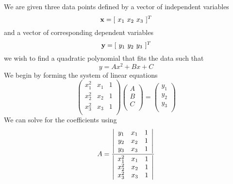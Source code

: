 We are given three data points defined by a vector of independent
variables
%
\begin{equation}
     \mathbf{x} = [\hspace{.05 in} x_1 \hspace{.05 in} x_2 \hspace{.05 in}
     x_3 \hspace{.05
     in}]^T
\end{equation}
%
and a vector of corresponding dependent variables
%
\begin{equation}
     \mathbf{y} = [\hspace{.05 in} y_1 \hspace{.05 in} y_2 \hspace{.05 in}
     y_3  \hspace{.05
     in}]^T
\end{equation}
%
we wish to find a quadratic polynomial that fits the data such that
%
\begin{equation}
   y = Ax^2 + Bx +C
\end{equation}
%
We begin by forming the system of linear equations
%
\begin{equation}
    \left(%
    \begin{array}{ccc}
       x_1^2 & x_1 & 1 \\
       x_2^2 & x_2 & 1 \\
       x_3^2 & x_3 & 1 \\
    \end{array}%
    \right)
     \left(%
    \begin{array}{ccc}
       A \\
       B \\
       C \\
    \end{array}%
    \right)
    =
     \left(%
    \begin{array}{ccc}
       y_1 \\
       y_2 \\
       y_3 \\
    \end{array}%
    \right)
\end{equation}
%
We can solve for the coefficients using
%
\begin{equation}
    A = \frac{
    \left|%
    \begin{array}{ccc}
       y_1 & x_1 & 1 \\
       y_2 & x_2 & 1 \\
       y_3 & x_3 & 1 \\
    \end{array}%
    \right|
    }
    {    \left|%
    \begin{array}{ccc}
       x_1^2 & x_1 & 1 \\
       x_2^2 & x_2 & 1 \\
       x_3^2 & x_3 & 1 \\
    \end{array}%
    \right|}
\end{equation}
